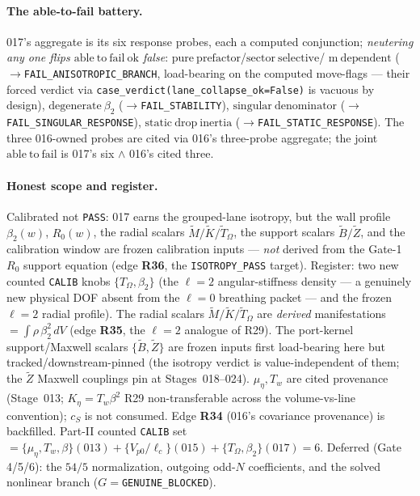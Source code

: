 \paragraph{The able-to-fail battery.}
017's aggregate is its six response probes, each a computed conjunction; \emph{neutering any one
flips \(\mathrm{able\ to\ fail\ ok}\) false}: \(\mathrm{pure\ prefactor}\)/\(\mathrm{sector\ selective}\)/
\(\mathrm{m\ dependent}\) (\(\to\)\texttt{FAIL\_ANISOTROPIC\_BRANCH}, load-bearing on the computed
move-flags --- their forced verdict via \texttt{case\_verdict(lane\_collapse\_ok=False)} is vacuous
by design), \(\mathrm{degenerate\ }\beta_2\) (\(\to\)\texttt{FAIL\_STABILITY}),
\(\mathrm{singular\ denominator}\) (\(\to\)\texttt{FAIL\_SINGULAR\_RESPONSE}),
\(\mathrm{static\ drop\ inertia}\) (\(\to\)\texttt{FAIL\_STATIC\_RESPONSE}). The three 016-owned
probes are cited via 016's three-probe aggregate; the joint \(\mathrm{able\ to\ fail}\) is 017's six
\(\wedge\) 016's cited three.

\paragraph{Honest scope and register.}
Calibrated not \texttt{PASS}: 017 earns the grouped-lane isotropy, but the wall profile
\(\beta_2(w)\), \(R_0(w)\), the radial scalars \(\tilde M/\tilde K/\tilde T_\Omega\), the support
scalars \(\tilde B/\tilde Z\), and the calibration window are frozen calibration inputs --- \emph{not}
derived from the Gate-1 \(R_0\) support equation (edge \textbf{R36}, the \texttt{ISOTROPY\_PASS}
target). Register: two new counted \texttt{CALIB} knobs \(\{T_\Omega,\beta_2\}\) (the \(\ell=2\)
angular-stiffness density --- a genuinely new physical DOF absent from the \(\ell=0\) breathing
packet --- and the frozen \(\ell=2\) radial profile). The radial scalars \(\tilde M/\tilde K/\tilde
T_\Omega\) are \emph{derived} manifestations \(=\int\!\rho\,\beta_2^2\,dV\) (edge \textbf{R35}, the
\(\ell=2\) analogue of R29). The port-kernel support/Maxwell scalars \(\{\tilde B,\tilde Z\}\) are
frozen inputs first load-bearing here but tracked/downstream-pinned (the isotropy verdict is
value-independent of them; the \(\tilde Z\) Maxwell couplings pin at Stages~018--024). \(\mu_\eta,T_w\)
are cited provenance (Stage~013; \(K_\eta=T_w\beta^2\) R29 non-transferable across the volume-vs-line
convention); \(c_S\) is not consumed. Edge \textbf{R34} (016's covariance provenance) is backfilled.
Part-II counted \texttt{CALIB} set \(=\{\mu_\eta,T_w,\beta\}(013)+\{V_{p0}/\ell_c\}(015)+\{T_\Omega,
\beta_2\}(017)=6\). Deferred (Gate 4/5/6): the \(54/5\) normalization, outgoing odd-\(N\) coefficients,
and the solved nonlinear branch (\(G=\)\texttt{GENUINE\_BLOCKED}).


